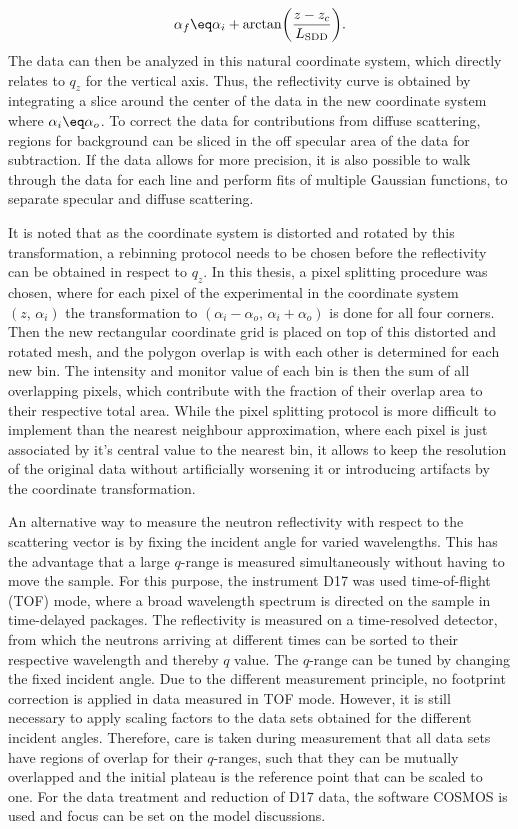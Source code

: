 \documentclass[\main/dresen_thesis.tex]{subfiles}
\begin{document}
    \begin{align}
      \alpha_f \eq \alpha_i + \arctan\biggl( \frac{z-z_c}{L_\mathrm{SDD}}\biggr).
    \end{align}
    The data can then be analyzed in this natural coordinate system, which directly relates to $q_z$ for the vertical axis.
    Thus, the reflectivity curve is obtained by integrating a slice around the center of the data in the new coordinate system where $\alpha_i \eq \alpha_o$.
    To correct the data for contributions from diffuse scattering, regions for background can be sliced in the off specular area of the data for subtraction.
    If the data allows for more precision, it is also possible to walk through the data for each line and perform fits of multiple Gaussian functions, to separate specular and diffuse scattering.

    It is noted that as the coordinate system is distorted and rotated by this transformation, a rebinning protocol needs to be chosen before the reflectivity can be obtained in respect to $q_z$.
    In this thesis, a pixel splitting procedure was chosen, where for each pixel of the experimental in the coordinate system $(z,\,\alpha_i)$ the transformation to $(\alpha_i - \alpha_o,\, \alpha_i+\alpha_o)$ is done for all four corners.
    Then the new rectangular coordinate grid is placed on top of this distorted and rotated mesh, and the polygon overlap is with each other is determined for each new bin.
    The intensity and monitor value of each bin is then the sum of all overlapping pixels, which contribute with the fraction of their overlap area to their respective total area.
    While the pixel splitting protocol is more difficult to implement than the nearest neighbour approximation, where each pixel is just associated by it's central value to the nearest bin, it allows to keep the resolution of the original data without artificially worsening it or introducing artifacts by the coordinate transformation.

    An alternative way to measure the neutron reflectivity with respect to the scattering vector is by fixing the incident angle for varied wavelengths.
    This has the advantage that a large $q$-range is measured simultaneously without having to move the sample.
    For this purpose, the instrument D17 was used time-of-flight (TOF) mode, where a broad wavelength spectrum is directed on the sample in time-delayed packages.
    The reflectivity is measured on a time-resolved detector, from which the neutrons arriving at different times can be sorted to their respective wavelength and thereby $q$ value.
    The $q$-range can be tuned by changing the fixed incident angle.
    Due to the different measurement principle, no footprint correction is applied in data measured in TOF mode.
    However, it is still necessary to apply scaling factors to the data sets obtained for the different incident angles.
    Therefore, care is taken during measurement that all data sets have regions of overlap for their $q$-ranges, such that they can be mutually overlapped and the initial plateau is the reference point that can be scaled to one.
    For the data treatment and reduction of D17 data, the software COSMOS \cite{Gutfreund_2018_Towar} is used and focus can be set on the model discussions.
\end{document}
